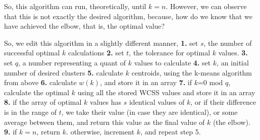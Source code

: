 \documentclass[12pt]{article}
\begin{document}
So, this algorithm can run, theoretically, until \( k=n \). \newline
However, we can observe that this is not exactly the desired algorithm, because, \newline
how do we know that we have achieved the elbow, that is, the optimal value? \newline

So, we edit this algorithm in a slightly different manner,\newline
\textbf{1.} set $s$, the number of successful optimal $k$ calculations \newline
\textbf{2.} set $t$, the tolerance for optimal $k$ values. \newline
\textbf{3.} set $q$, a number representing a quant of $k$ values to calculate \newline
\textbf{4.} set $k$, an initial number of desired clusters \newline
\textbf{5.} calculate $k$ centroids, using the k-means algorithm from above \newline
\textbf{6.} calculate $w(k)$, and store it in an array \newline
\textbf{7.} if $k$=0 mod $q$, calculate the optimal $k$ using all the stored WCSS values and store it in an array \newline
\textbf{8.} if the array of optimal $k$ values has $s$ identical values of $k$, or if their difference is in the range of $t$, we take their value (in case they are identical), or some average between them, and return this value as the final value of $k$ (the elbow). \newline
\textbf{9.} if $k=n$, return $k$. otherwise, increment $k$, and repeat step 5. \newline
\end{document}

